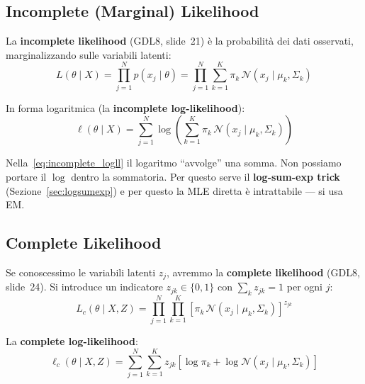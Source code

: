 \documentclass[11pt,a4paper]{article}
\newcommand{\refslide}[2]{\textsc{#1}, slide~#2}
\begin{document}
\subsection{Incomplete (Marginal) Likelihood}

La \textbf{incomplete likelihood} (\refslide{GDL8}{21}) è la probabilità
dei dati osservati, marginalizzando sulle variabili latenti:
\begin{equation}\label{eq:incomplete_ll}
  L(\theta \mid X) = \prod_{j=1}^{N} p(x_j \mid \theta)
  = \prod_{j=1}^{N} \sum_{k=1}^{K} \pi_k \,
  \mathcal{N}(x_j \mid \mu_k, \Sigma_k)
\end{equation}

In forma logaritmica (la \textbf{incomplete log-likelihood}):
\begin{equation}\label{eq:incomplete_logll}
  \ell(\theta \mid X) = \sum_{j=1}^{N} \log\!\left(
  \sum_{k=1}^{K} \pi_k \, \mathcal{N}(x_j \mid \mu_k, \Sigma_k)
  \right)
\end{equation}

\begin{warnbox}
Nella~\eqref{eq:incomplete_logll} il logaritmo ``avvolge'' una somma.
Non possiamo portare il $\log$ dentro la sommatoria. Per questo serve
il \textbf{log-sum-exp trick} (Sezione~\ref{sec:logsumexp}) e per
questo la MLE diretta è intrattabile --- si usa EM.
\end{warnbox}

\subsection{Complete Likelihood}

Se conoscessimo le variabili latenti $z_j$, avremmo la \textbf{complete
likelihood} (\refslide{GDL8}{24}). Si introduce un indicatore
$z_{jk} \in \{0,1\}$ con $\sum_k z_{jk}=1$ per ogni $j$:
\begin{equation}\label{eq:complete_ll}
  L_c(\theta \mid X, Z) = \prod_{j=1}^{N} \prod_{k=1}^{K}
  \left[\pi_k \, \mathcal{N}(x_j \mid \mu_k, \Sigma_k)\right]^{z_{jk}}
\end{equation}

La \textbf{complete log-likelihood}:
\begin{equation}\label{eq:complete_logll}
  \ell_c(\theta \mid X, Z) = \sum_{j=1}^{N} \sum_{k=1}^{K}
  z_{jk} \left[\log \pi_k + \log \mathcal{N}(x_j \mid \mu_k,
  \Sigma_k)\right]
\end{equation}
\end{document}
